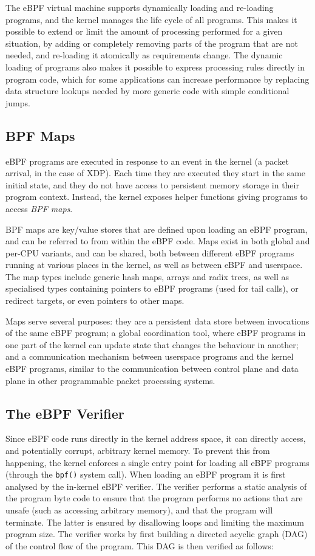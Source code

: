 \documentclass[sigconf]{acmart}
\begin{document}
The eBPF virtual machine supports dynamically loading and re-loading programs,
and the kernel manages the life cycle of all programs. This makes it possible to
extend or limit the amount of processing performed for a given situation, by
adding or completely removing parts of the program that are not needed, and
re-loading it atomically as requirements change. The dynamic loading of programs
also makes it possible to express processing rules directly in program code,
which for some applications can increase performance by replacing data structure
lookups needed by more generic code with simple conditional jumps.

\subsection{BPF Maps}
\label{sec:bpf-maps}
eBPF programs are executed in response to an event in the kernel (a packet
arrival, in the case of XDP). Each time they are executed they start in the same
initial state, and they do not have access to persistent memory storage in their
program context. Instead, the kernel exposes helper functions giving programs to
access \emph{BPF maps}.

BPF maps are key/value stores that are defined upon loading an eBPF program, and
can be referred to from within the eBPF code. Maps exist in both global and
per-CPU variants, and can be shared, both between different eBPF programs
running at various places in the kernel, as well as between eBPF and userspace.
The map types include generic hash maps, arrays and radix trees, as well as
specialised types containing pointers to eBPF programs (used for tail calls), or
redirect targets, or even pointers to other maps.

Maps serve several purposes: they are a persistent data store between
invocations of the same eBPF program; a global coordination tool, where eBPF
programs in one part of the kernel can update state that changes the behaviour
in another; and a communication mechanism between userspace programs and the
kernel eBPF programs, similar to the communication between control plane and
data plane in other programmable packet processing systems.

\subsection{The eBPF Verifier}
\label{sec:bpf-verifier}
Since eBPF code runs directly in the kernel address space, it can directly
access, and potentially corrupt, arbitrary kernel memory. To prevent this from
happening, the kernel enforces a single entry point for loading all eBPF
programs (through the \texttt{bpf()} system call). When loading an eBPF program
it is first analysed by the in-kernel eBPF verifier. The verifier performs a
static analysis of the program byte code to ensure that the program performs no
actions that are unsafe (such as accessing arbitrary memory), and that the
program will terminate. The latter is ensured by disallowing loops and limiting
the maximum program size. The verifier works by first building a directed
acyclic graph (DAG) of the control flow of the program. This DAG is then
verified as follows:
\end{document}
